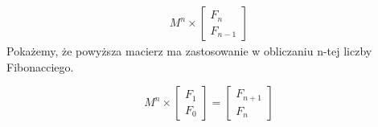 \begin{align*}
  M^n \times \begin{bmatrix}F_n \\ F_{n - 1}\end{bmatrix}
\end{align*}
Pokażemy, że powyższa macierz ma zastosowanie w obliczaniu n-tej liczby Fibonacciego.
\begin{lemma}
  \begin{equation*}
    M^{n} \times \begin{bmatrix}F_1 \\ F_0\end{bmatrix} = \begin{bmatrix}F_{n + 1} \\ F_{n}\end{bmatrix}
  \end{equation*}
\end{lemma}

